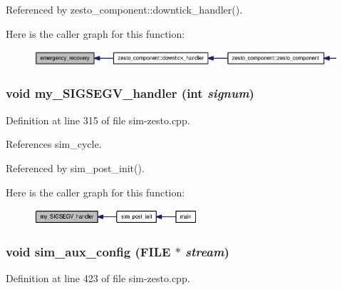 Referenced by zesto\_\-component::downtick\_\-handler().

Here is the caller graph for this function:\nopagebreak
\begin{figure}[H]
\begin{center}
\leavevmode
\includegraphics[width=325pt]{sim-zesto_8cpp_46f3df2fecce36d299cd1dd4534d0088_icgraph}
\end{center}
\end{figure}
\subsubsection[{my\_\-SIGSEGV\_\-handler}]{\setlength{\rightskip}{0pt plus 5cm}void my\_\-SIGSEGV\_\-handler (int {\em signum})}\label{sim-zesto_8cpp_b35cfeccf968c0e4d7ce20475c5b8b69}




Definition at line 315 of file sim-zesto.cpp.

References sim\_\-cycle.

Referenced by sim\_\-post\_\-init().

Here is the caller graph for this function:\nopagebreak
\begin{figure}[H]
\begin{center}
\leavevmode
\includegraphics[width=172pt]{sim-zesto_8cpp_b35cfeccf968c0e4d7ce20475c5b8b69_icgraph}
\end{center}
\end{figure}
\subsubsection[{sim\_\-aux\_\-config}]{\setlength{\rightskip}{0pt plus 5cm}void sim\_\-aux\_\-config (FILE $\ast$ {\em stream})}\label{sim-zesto_8cpp_67e5d7a21600d2eb1fb2f0798fc24a7c}




Definition at line 423 of file sim-zesto.cpp.

